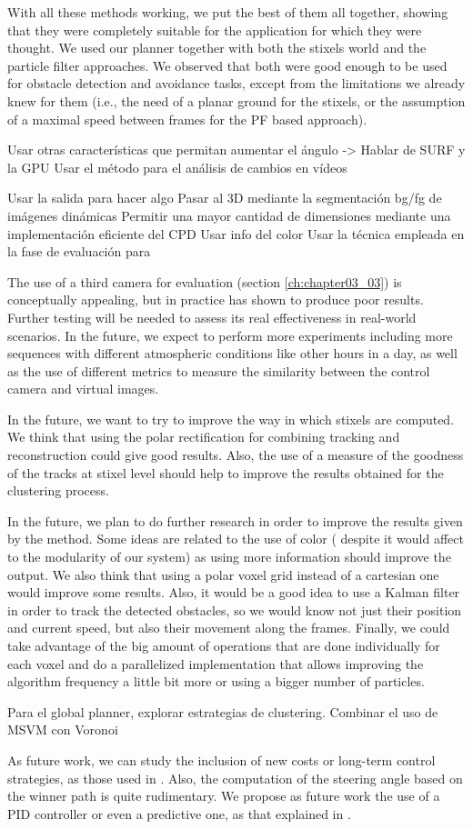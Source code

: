 With all these methods working, we put the best of them all together, showing that they were completely suitable for the application for which they were thought. We used our planner together with both the stixels world and the particle filter approaches. We observed that both were good enough to be used for obstacle detection and avoidance tasks, except from the limitations we already knew for them (i.e., the need of a planar ground for the stixels, or the assumption of a maximal speed between frames for the \ac{PF} based approach).


Usar otras características que permitan aumentar el ángulo -> Hablar de SURF y la GPU
Usar el método para el análisis de cambios en vídeos

Usar la salida para hacer algo
Pasar al 3D mediante la segmentación bg/fg de imágenes dinámicas
Permitir una mayor cantidad de dimensiones mediante una implementación eficiente del CPD
Usar info del color
Usar la técnica empleada en la fase de evaluación para 

The use of a third camera for evaluation (section \ref{ch:chapter03_03}) is conceptually appealing, but in practice has shown to produce poor results. Further testing will be needed to assess its real effectiveness in real-world scenarios. In the future, we expect to perform more experiments including more sequences with different atmospheric conditions like other hours in a day, as well as the use of different metrics to measure the similarity between the control camera and virtual images.

In the future, we want to try to improve the way in which stixels are computed. We think that using the polar rectification for combining tracking and reconstruction could give good results. Also, the use of a measure of the goodness of the tracks at stixel level should help to improve the results obtained for the clustering process.

In the future, we plan to do further research in order to improve the results given by the method. Some ideas are related to the use of color ( despite it would affect to the modularity of our system) as using more information should improve the output. We also think that using a polar voxel grid instead of a cartesian one would improve some results. Also, it would be a good idea to use a Kalman filter in order to track the detected obstacles, so we would know not just their position and current speed, but also their movement along the frames. Finally, we could take advantage of the big amount of operations that are done individually for each voxel and do a parallelized implementation that allows improving the algorithm frequency a little bit more or using a bigger number of particles.

Para el global planner, explorar estrategias de clustering. Combinar el uso de MSVM con Voronoi

As future work, we can study the inclusion of new costs or long-term control strategies, as those used in \cite{werling2010optimal}. Also, the computation of the steering angle based on the winner path is quite rudimentary. We propose as future work the use of a PID controller or even a predictive one, as that explained in .